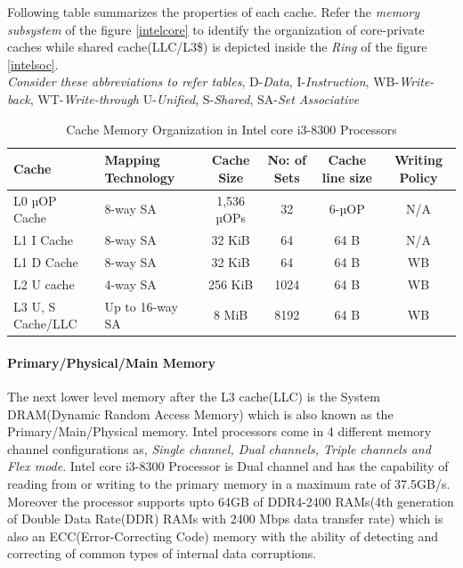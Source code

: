 \documentclass[a4paper,11pt]{article}
\begin{document}
 Following table summarizes the properties of each cache. Refer the \textit{memory subsystem} of the figure \ref{intelcore} to identify the organization of core-private caches while shared cache(LLC/L3\$) is depicted inside the \textit{Ring} of the figure \ref{intelsoc}.\\

{\footnotesize \textit{Consider these abbreviations to refer tables},
D-\textit{Data}, I-\textit{Instruction}, WB-\textit{Write-back}, WT-\textit{Write-through} U-\textit{Unified}, S-\textit{Shared}, SA-\textit{Set Associative}}

 \begin{table}[!h]
	\centering
	\begin{tabular}{l| l |c |c |c|c}
		Cache  & Mapping Technology &Cache Size & No: of Sets&Cache line size& Writing Policy\\
		\hline
		L0 µOP Cache&8-way SA&1,536 µOPs&32&6-µOP&	N/A\\
		L1 I Cache &8-way SA&32 KiB&64&64 B&N/A\\
		L1 D Cache&8-way SA&32 KiB&64&64 B&WB\\
		L2 U cache&4-way SA&256 KiB&1024&64 B&WB\\
		L3 U, S Cache/LLC&Up to 16-way SA&8 MiB&8192&64 B&WB\\
		\hline\hline
	\end{tabular}
	\caption{Cache Memory Organization in Intel core i3-8300 Processors\cite{Coffee}}
\end{table}

\paragraph{Primary/Physical/Main Memory}
The next lower level memory after the L3 cache(LLC) is the System DRAM(Dynamic Random Access Memory) which is also known as the Primary/Main/Physical memory. Intel processors come in 4 different memory channel configurations as, \textit{Single channel, Dual channels, Triple channels and Flex mode}. Intel core i3-8300 Processor is Dual channel and has the capability of reading from or writing to the primary memory in a maximum rate of  37.5GB/s. Moreover the processor supports upto 64GB of DDR4-2400 RAMs(4th generation of Double Data Rate(DDR) RAMs with 2400 Mbps data transfer rate) which is also an ECC(Error-Correcting Code) memory with the ability of detecting and correcting of common types of internal data corruptions.
\end{document}
